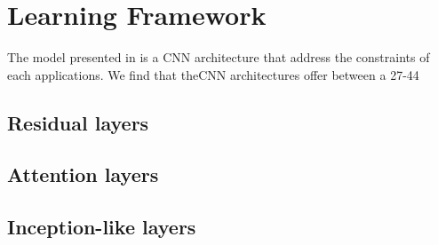 \section{Learning Framework}
The model presented in \cite{sainath2015convolutional} is a CNN architecture that address the constraints of each applications. We find that theCNN architectures offer between a 27-44%

\subsection{Residual layers}
\subsection{Attention layers}
\subsection{Inception-like layers}
